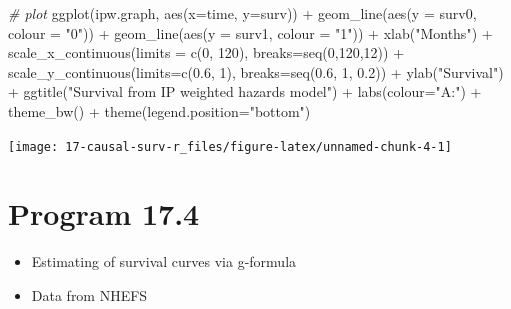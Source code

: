 \documentclass[
  10pt,
]{book}
\newenvironment{Shaded}{\begin{snugshade}}{\end{snugshade}}
\newcommand{\AttributeTok}[1]{\textcolor[rgb]{0.77,0.63,0.00}{#1}}
\newcommand{\CommentTok}[1]{\textcolor[rgb]{0.56,0.35,0.01}{\textit{#1}}}
\newcommand{\DecValTok}[1]{\textcolor[rgb]{0.00,0.00,0.81}{#1}}
\newcommand{\FloatTok}[1]{\textcolor[rgb]{0.00,0.00,0.81}{#1}}
\newcommand{\FunctionTok}[1]{\textcolor[rgb]{0.00,0.00,0.00}{#1}}
\newcommand{\NormalTok}[1]{#1}
\newcommand{\SpecialCharTok}[1]{\textcolor[rgb]{0.00,0.00,0.00}{#1}}
\newcommand{\StringTok}[1]{\textcolor[rgb]{0.31,0.60,0.02}{#1}}
\providecommand{\tightlist}{%
  \setlength{\itemsep}{0pt}\setlength{\parskip}{0pt}}
\begin{document}
\begin{Shaded}
\begin{Highlighting}[]
\CommentTok{\# plot}
\FunctionTok{ggplot}\NormalTok{(ipw.graph, }\FunctionTok{aes}\NormalTok{(}\AttributeTok{x=}\NormalTok{time, }\AttributeTok{y=}\NormalTok{surv)) }\SpecialCharTok{+} 
  \FunctionTok{geom\_line}\NormalTok{(}\FunctionTok{aes}\NormalTok{(}\AttributeTok{y =}\NormalTok{ surv0, }\AttributeTok{colour =} \StringTok{"0"}\NormalTok{)) }\SpecialCharTok{+} 
  \FunctionTok{geom\_line}\NormalTok{(}\FunctionTok{aes}\NormalTok{(}\AttributeTok{y =}\NormalTok{ surv1, }\AttributeTok{colour =} \StringTok{"1"}\NormalTok{)) }\SpecialCharTok{+} 
  \FunctionTok{xlab}\NormalTok{(}\StringTok{"Months"}\NormalTok{) }\SpecialCharTok{+} 
  \FunctionTok{scale\_x\_continuous}\NormalTok{(}\AttributeTok{limits =} \FunctionTok{c}\NormalTok{(}\DecValTok{0}\NormalTok{, }\DecValTok{120}\NormalTok{), }\AttributeTok{breaks=}\FunctionTok{seq}\NormalTok{(}\DecValTok{0}\NormalTok{,}\DecValTok{120}\NormalTok{,}\DecValTok{12}\NormalTok{)) }\SpecialCharTok{+}
  \FunctionTok{scale\_y\_continuous}\NormalTok{(}\AttributeTok{limits=}\FunctionTok{c}\NormalTok{(}\FloatTok{0.6}\NormalTok{, }\DecValTok{1}\NormalTok{), }\AttributeTok{breaks=}\FunctionTok{seq}\NormalTok{(}\FloatTok{0.6}\NormalTok{, }\DecValTok{1}\NormalTok{, }\FloatTok{0.2}\NormalTok{)) }\SpecialCharTok{+}
  \FunctionTok{ylab}\NormalTok{(}\StringTok{"Survival"}\NormalTok{) }\SpecialCharTok{+} 
  \FunctionTok{ggtitle}\NormalTok{(}\StringTok{"Survival from IP weighted hazards model"}\NormalTok{) }\SpecialCharTok{+} 
  \FunctionTok{labs}\NormalTok{(}\AttributeTok{colour=}\StringTok{"A:"}\NormalTok{) }\SpecialCharTok{+}
  \FunctionTok{theme\_bw}\NormalTok{() }\SpecialCharTok{+} 
  \FunctionTok{theme}\NormalTok{(}\AttributeTok{legend.position=}\StringTok{"bottom"}\NormalTok{)}
\end{Highlighting}
\end{Shaded}

\begin{center}\texttt{[image: 17-causal-surv-r\_files/figure-latex/unnamed-chunk-4-1]} \end{center}

\hypertarget{program-17.4}{%
\section{Program 17.4}\label{program-17.4}}

\begin{itemize}
\tightlist
\item
  Estimating of survival curves via g-formula
\item
  Data from NHEFS
\end{itemize}
\end{document}
